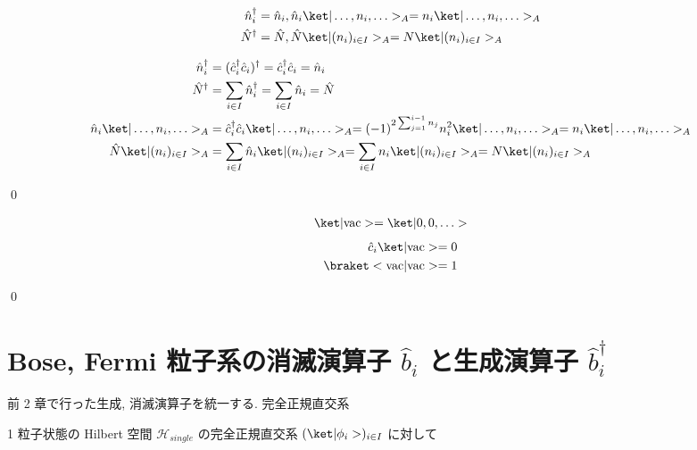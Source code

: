 \documentclass[uplatex,dvipdfmx,a4paper,11pt]{jlreq}
\makeatletter
\newcommand{\HH}{\mathcal{H}}
\numberwithin{equation}{section}
\theoremstyle{definition}
\renewenvironment{proof}[1][\proofname]{\par
  \normalfont
  \topsep6\p@\@plus6\p@ \trivlist
  \item[\hskip\labelsep{\bfseries #1}\@addpunct{\bfseries}]\ignorespaces\quad\par
}{
  \qed\endtrivlist\@endpefalse
}
\renewcommand\proofname{証明}
\makeatother
\begin{document}
\begin{proposition}
  \begin{align}
    \hat{n}_i^\dagger & = \hat{n}_i, \hat{n}_i\ket|\ldots,n_i,\ldots>_A = n_i\ket|\ldots,n_i,\ldots>_A \\
    \hat{N}^\dagger   & = \hat{N}, \hat{N}\ket|(n_i)_{i\in I}>_A = N\ket|(n_i)_{i\in I}>_A
  \end{align}
\end{proposition}
\begin{proof}
  \begin{align}
    \hat{n}_i^\dagger                  & = (\hat{c}_i^\dagger\hat{c}_i)^\dagger = \hat{c}_i^\dagger\hat{c}_i = \hat{n}_i                                                                  \\
    \hat{N}^\dagger                    & = \sum_{i\in I}\hat{n}_i^\dagger = \sum_{i\in I}\hat{n}_i = \hat{N}                                                                              \\
    \hat{n}_i\ket|\ldots,n_i,\ldots>_A & = \hat{c}_i^\dagger\hat{c}_i\ket|\ldots,n_i,\ldots>_A = (-1)^{2\sum_{j=1}^{i-1}n_j}n_i^2\ket|\ldots,n_i,\ldots>_A = n_i\ket|\ldots,n_i,\ldots>_A \\
    \hat{N}\ket|(n_i)_{i\in I}>_A      & = \sum_{i\in I}\hat{n}_i\ket|(n_i)_{i\in I}>_A = \sum_{i\in I}n_i\ket|(n_i)_{i\in I}>_A = N\ket|(n_i)_{i\in I}>_A
  \end{align}
\end{proof}

\begin{proposition}
  \begin{align}
    \ket|\mathrm{vac}> = \ket|0,0,\ldots>
  \end{align}
  \begin{align}
    \hat{c}_i\ket|\mathrm{vac}> = 0 \\
    \braket<\mathrm{vac}|\mathrm{vac}> = 1
  \end{align}
\end{proposition}
\begin{proof}

\end{proof}

\section{Bose, Fermi 粒子系の消滅演算子 $\hat{b}_i$ と生成演算子 $\hat{b}_i^\dagger$}
前 2 章で行った生成, 消滅演算子を統一する.
完全正規直交系
\begin{definition}
  1 粒子状態の Hilbert 空間 $\HH_{single}$ の完全正規直交系 $(\ket|\phi_i>)_{i\in I}$ に対して
\end{definition}
\end{document}
